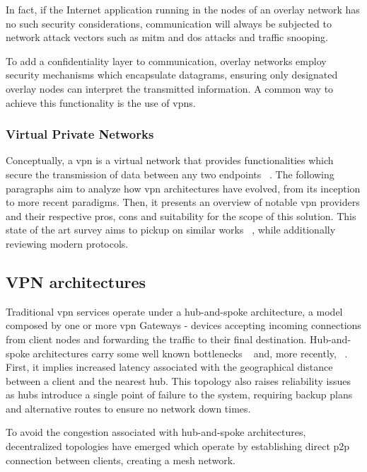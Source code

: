 \documentclass[11pt,twoside,a4paper]{report}
\begin{document}
In fact, if the Internet application running in the nodes of an overlay network has no such security considerations, communication will always be subjected to network attack vectors such as \ac{mitm} and \ac{dos} attacks and traffic snooping.

To add a confidentiality layer to communication, overlay networks employ security mechanisms which encapsulate datagrams, ensuring only designated overlay nodes can interpret the transmitted information. A common way to achieve this functionality is the use of \acp{vpn}.

\subsubsection{Virtual Private Networks}

Conceptually, a \ac{vpn} is a virtual network that provides functionalities which secure the transmission of data between any two endpoints ~\cite{HARMENING2017843}. The following paragraphs aim to analyze how \ac{vpn} architectures have evolved, from its inception to more recent paradigms. Then, it presents an overview of notable \ac{vpn} providers and their respective pros, cons and suitability for the scope of this solution. This state of the art survey aims to pickup on similar works ~\cite{zuqueteseguranca, berger2006analysis}, while additionally reviewing modern protocols.

\subsection{VPN architectures}

Traditional \ac{vpn} services operate under a hub-and-spoke architecture, a model composed by one or more \ac{vpn} Gateways - devices accepting incoming connections from client nodes and forwarding the traffic to their final destination. Hub-and-spoke architectures carry some well known bottlenecks ~\cite{ELHEDHLI20051615, o1998geographer} and, more recently, ~\cite{AN2015103}. First, it implies increased latency associated with the geographical distance between a client and the nearest hub. This topology also raises reliability issues as hubs introduce a single point of failure to the system, requiring backup plans and alternative routes to ensure no network down times.

To avoid the congestion associated with hub-and-spoke architectures, decentralized topologies have emerged which operate by establishing direct \ac{p2p} connection between clients, creating a mesh network.
\end{document}
